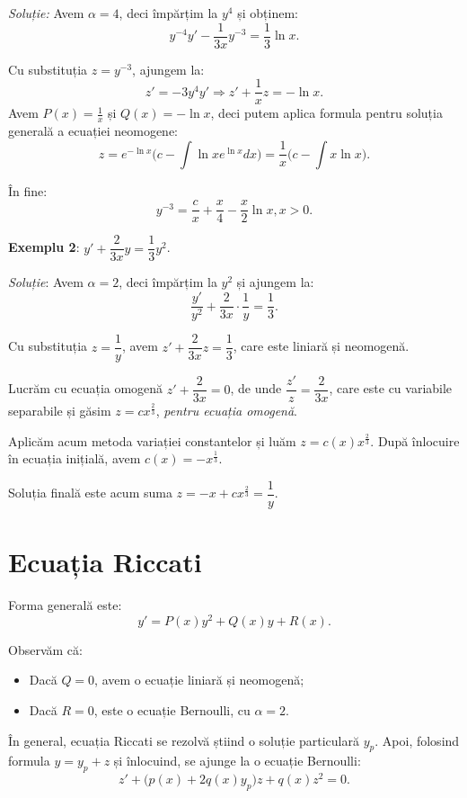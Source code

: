 \emph{Soluție:} Avem $\alpha = 4$, deci împărțim la $y^4$ și obținem:
\[
  y^{-4} y' - \frac{1}{3x} y^{-3} = \frac{1}{3} \ln x.
\]

Cu substituția $z = y^{-3}$, ajungem la:
\[
  z' = - 3y^4 y' \Rightarrow z' + \frac{1}{x} z = -\ln x.
\]
Avem $P(x) = \frac{1}{x}$ și $Q(x) = -\ln x$, deci putem aplica formula pentru
soluția generală a ecuației neomogene:
\[
  z = e^{-\ln x} \Big( c - \int \ln x e^{\ln x} dx \Big) = \frac{1}{x} \Big( c - \int x \ln x \Big).
\]

În fine:
\[
  y^{-3} = \frac{c}{x} + \frac{x}{4} - \frac{x}{2} \ln x, x > 0.
\]

\vspace{1cm}

\textbf{Exemplu 2}: $y' + \dfrac{2}{3x}y = \dfrac{1}{3} y^2$.

\emph{Soluție}: Avem $\alpha = 2$, deci împărțim la $y^2$ și ajungem la:
\[
  \frac{y'}{y^2} + \frac{2}{3x} \cdot \frac{1}{y} = \frac{1}{3}.
\]

Cu substituția $z = \dfrac{1}{y}$, avem $z' + \dfrac{2}{3x} z = \dfrac{1}{3}$,
care este liniară și neomogenă.

Lucrăm cu ecuația omogenă $z' + \dfrac{2}{3x} = 0$, de unde $\dfrac{z'}{z} = \dfrac{2}{3x}$,
care este cu variabile separabile și găsim $z = cx^{\frac{2}{3}}$, \emph{pentru ecuația omogenă}.

Aplicăm acum metoda variației constantelor și luăm $z = c(x) x^{\frac{2}{3}}$. După înlocuire
în ecuația inițială, avem $c(x) = -x^{\frac{1}{3}}$.

Soluția finală este acum suma $z = -x + cx^{\frac{2}{3}} = \dfrac{1}{y}$.


\section{Ecuația Riccati}
\label{sec:ec-ric}

Forma generală este:
\[
  y' = P(x) y^2 + Q(x) y + R(x).
\]

Observăm că:
\begin{itemize}
\item Dacă $Q = 0$, avem o ecuație liniară și neomogenă;
\item Dacă $R = 0$, este o ecuație Bernoulli, cu $\alpha = 2$.
\end{itemize}
  
În general, ecuația Riccati se rezolvă știind o soluție particulară $y_p$. Apoi,
folosind formula $y = y_p + z$ și înlocuind, se ajunge la o ecuație Bernoulli:
\[
  z' + \big(p(x) + 2q(x) y_p\big)z + q(x) z^2 = 0.
\]

